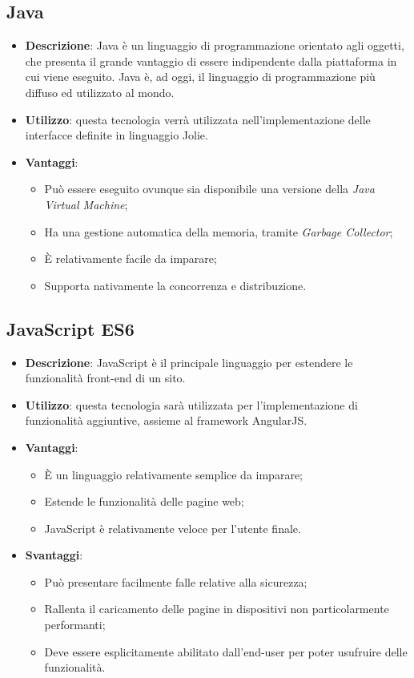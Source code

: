 \subsection{Java}
\begin{itemize}
	\item \textbf{Descrizione}: Java è un linguaggio di programmazione orientato agli oggetti, che presenta il grande vantaggio di essere indipendente dalla piattaforma in cui viene eseguito. Java è, ad oggi, il linguaggio di programmazione più diffuso ed utilizzato al mondo.
	\item \textbf{Utilizzo}: questa tecnologia verrà utilizzata nell'implementazione delle interfacce definite in linguaggio Jolie.
	\item \textbf{Vantaggi}:
	\begin{itemize}
		\item Può essere eseguito ovunque sia disponibile una versione della \textit{Java Virtual Machine};
		\item Ha una gestione automatica della memoria, tramite \textit{Garbage Collector};
		\item \MakeUppercase{è} relativamente facile da imparare;
		\item Supporta nativamente la concorrenza e distribuzione.
	\end{itemize}
\end{itemize}

\subsection{JavaScript ES6}
\begin{itemize}
	\item \textbf{Descrizione}: JavaScript è il principale linguaggio per estendere le funzionalità front-end di un sito.
	\item \textbf{Utilizzo}: questa tecnologia sarà utilizzata per l'implementazione di funzionalità aggiuntive, assieme al framework AngularJS.
	\item \textbf{Vantaggi}:
	\begin{itemize}
		\item \MakeUppercase{è} un linguaggio relativamente semplice da imparare;
		\item Estende le funzionalità delle pagine web;
		\item JavaScript è relativamente veloce per l'utente finale.
	\end{itemize}
	\item \textbf{Svantaggi}:
	\begin{itemize}
		\item Può presentare facilmente falle relative alla sicurezza;
		\item Rallenta il caricamento delle pagine in dispositivi non particolarmente performanti;
		\item Deve essere esplicitamente abilitato dall'end-user per poter usufruire delle funzionalità.
	\end{itemize}
\end{itemize}

